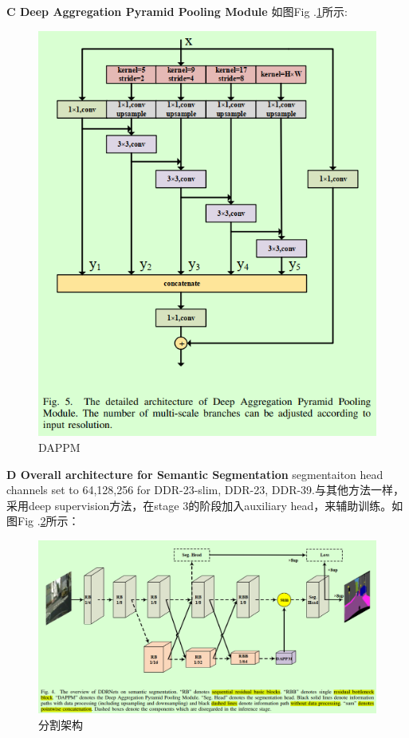 \documentclass{article}
\begin{document}
\textbf{C Deep Aggregation Pyramid Pooling Module}
如图Fig .\ref{Fig.ddr_dappm}所示:
\begin{figure}
\centering
\includegraphics[scale=0.3]{image/DDR_dappm.png}
\caption{DAPPM}
\label{Fig.ddr_dappm}
\end{figure}

\textbf{D Overall architecture for Semantic Segmentation}
segmentaiton head channels set to 64,128,256 for DDR-23-slim, DDR-23, DDR-39.与其他方法一样，采用deep supervision方法，在stage 3的阶段加入auxiliary head，来辅助训练。如图Fig .\ref{Fig.ddr_arch2}所示：
\begin{figure}
\centering
\includegraphics[scale=0.3]{image/DDR_arch2.png}
\caption{分割架构}
\label{Fig.ddr_arch2}
\end{figure}
\end{document}
